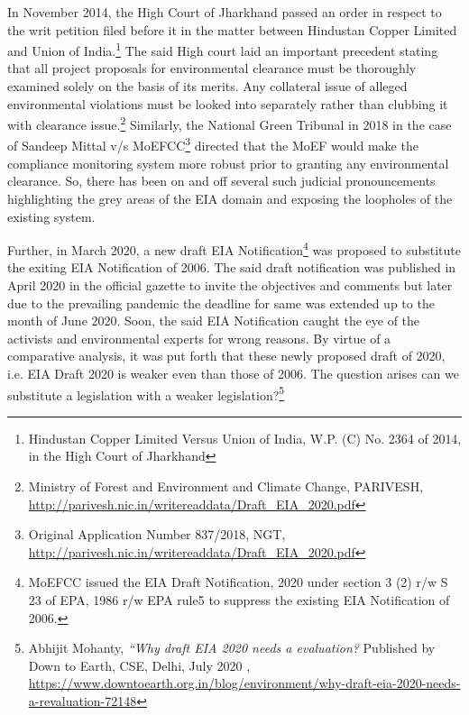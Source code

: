 \begin{multicols}{2}

\noi
In November 2014, the High Court of Jharkhand passed an order in respect to the writ
petition filed before it in the matter between Hindustan Copper Limited and Union of India.\footnote{Hindustan Copper Limited Versus Union of India, W.P. (C) No. 2364 of 2014, in the High Court of
Jharkhand}
The said High court laid an important precedent stating that all project proposals for
environmental clearance must be thoroughly examined solely on the basis of its merits. Any
collateral issue of alleged environmental violations must be looked into separately rather than
clubbing it with clearance issue.\footnote{Ministry of Forest and Environment and Climate Change, PARIVESH,
\url{http://parivesh.nic.in/writereaddata/Draft_EIA_2020.pdf}} Similarly, the National Green Tribunal in 2018 in the case
of Sandeep Mittal v/s MoEFCC\footnote{Original Application Number 837/2018, NGT, \url{http://parivesh.nic.in/writereaddata/Draft_EIA_2020.pdf}} directed that the MoEF would make the compliance
monitoring system more robust prior to granting any environmental clearance. So, there has
been on and off several such judicial pronouncements highlighting the grey areas of the EIA
domain and exposing the loopholes of the existing system.

\noi
Further, in March 2020, a new draft EIA Notification\footnote{MoEFCC issued the EIA Draft Notification, 2020 under section 3 (2) r/w S 23 of EPA, 1986 r/w EPA rule5 to
suppress the existing EIA Notification of 2006.} was proposed to substitute the exiting
EIA Notification of 2006. The said draft notification was published in April 2020 in the
official gazette to invite the objectives and comments but later due to the prevailing pandemic
the deadline for same was extended up to the month of June 2020. Soon, the said EIA
Notification caught the eye of the activists and environmental experts for wrong reasons. By
virtue of a comparative analysis, it was put forth that these newly proposed draft of 2020, i.e.
EIA Draft 2020 is weaker even than those of 2006. The question arises can we substitute a
legislation with a weaker legislation?\footnote{Abhijit Mohanty, \textit{“Why draft EIA 2020 needs a evaluation?} Published by Down to Earth, CSE, Delhi, July
2020 , \url{https://www.downtoearth.org.in/blog/environment/why-draft-eia-2020-needs-a-revaluation-72148}}

\vspace{-.15cm}


\end{multicols}
